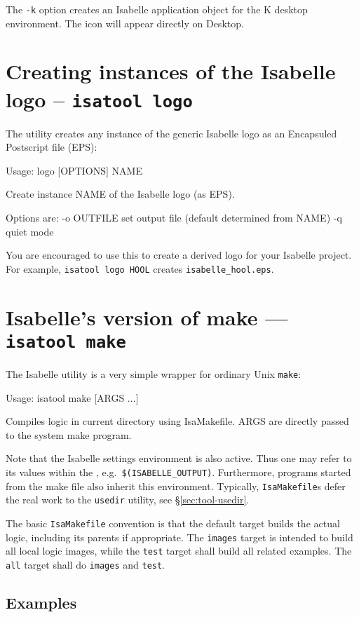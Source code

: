 The \texttt{-k} option creates an Isabelle application object for the K
desktop environment.  The icon will appear directly on Desktop.


\section{Creating instances of the Isabelle logo -- \texttt{isatool
    logo}}

The  utility creates any instance of the generic Isabelle logo as
an Encapsuled Postscript file (EPS):
\begin{ttbox}
Usage: logo [OPTIONS] NAME

  Create instance NAME of the Isabelle logo (as EPS).

  Options are:
    -o OUTFILE   set output file (default determined from NAME)
    -q           quiet mode
\end{ttbox}
You are encouraged to use this to create a derived logo for your Isabelle
project.  For example, \texttt{isatool logo HOOL} creates
\texttt{isabelle_hool.eps}.


\section{Isabelle's version of make --- \texttt{isatool make}}

The Isabelle  utility is a very simple wrapper for
ordinary Unix \texttt{make}:
\begin{ttbox}
Usage: isatool make [ARGS ...]

  Compiles logic in current directory using IsaMakefile.
  ARGS are directly passed to the system make program.
\end{ttbox}
Note that the Isabelle settings environment is also active. Thus one
may refer to its values within the , e.g.\ 
\texttt{\$(ISABELLE_OUTPUT)}. Furthermore, programs started from the
make file also inherit this environment.  Typically,
\texttt{IsaMakefile}s defer the real work to the \texttt{usedir}
utility, see \S\ref{sec:tool-usedir}.

\medskip The basic \texttt{IsaMakefile} convention is that the default
target builds the actual logic, including its parents if appropriate.
The \texttt{images} target is intended to build all local logic
images, while the \texttt{test} target shall build all related
examples.  The \texttt{all} target shall do \texttt{images} and
\texttt{test}.


\subsection*{Examples}

